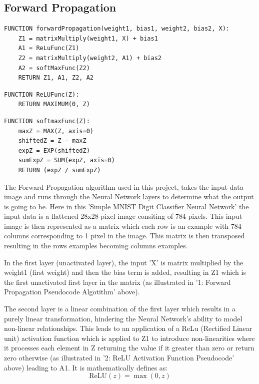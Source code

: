 \documentclass[11pt]{article}
\begin{document}
\subsection{Forward Propagation}

\begin{lstlisting}[language={},mathescape=true, caption={Forward Propagation Pseudocode Algorithm}]
FUNCTION forwardPropagation(weight1, bias1, weight2, bias2, X):
    Z1 = matrixMultiply(weight1, X) + bias1
    A1 = ReLuFunc(Z1)
    Z2 = matrixMultiply(weight2, A1) + bias2
    A2 = softMaxFunc(Z2)
    RETURN Z1, A1, Z2, A2
\end{lstlisting}

\vspace{1em}

\begin{lstlisting}[language={},mathescape=true, caption={ReLu Activation Function Pseudocode}]
FUNCTION ReLUFunc(Z):
    RETURN MAXIMUM(0, Z)
\end{lstlisting}

\begin{lstlisting}[language={},mathescape=true, caption={Softmax Activation Function Pseudocode}]
FUNCTION softmaxFunc(Z):
    maxZ = MAX(Z, axis=0)
    shiftedZ = Z - maxZ
    expZ = EXP(shiftedZ)
    sumExpZ = SUM(expZ, axis=0)
    RETURN (expZ / sumExpZ)
\end{lstlisting}

\vspace{1em}
The Forward Propagation algorithm used in this project, takes the input data image and runs through the Neural Network layers to determine what the output is going to be. Here in this 'Simple MNIST Digit Classifier Neural Network' the input data is a flattened 28x28 pixel image consiting of 784 pixels. This input image is then represented as a matrix which each row is an example with 784 columns corresponding to 1 pixel in the image. This matrix is then transposed resulting in the rows  examples becoming columns examples. 

\vspace{1em}
In the first layer (unactivated layer), the input 'X' is matrix multiplied by the weight1 (first weight) and then the bias term is added, resulting in Z1 which is the first unactivated first layer in the matrix (as illustrated in '1: Forward Propagation Pseudocode Algotithm' above). 

\vspace{1em}
The second layer is a linear combination of the first layer which results in a purely linear transformation, hindering the Neural Network's ability to model non-linear relationships. This leads to an application of a ReLu (Rectified Linear unit) activation function which is applied to Z1 to introduce non-linearities where it processes each element in Z returning the value if it greater than zero or return zero otherwise (as illustrated in '2: ReLU Activation Function Pseudocode' above) leading to A1. It is mathematically defines as: 
\begin{equation}
\text{ReLU}(z) = \max(0, z)
\end{equation}
\end{document}
